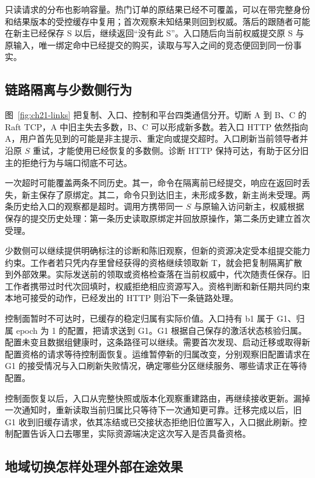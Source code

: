 只读请求的分布也影响容量。热门订单的原结果已经不可覆盖，可以在带完整身份和结果版本的受控缓存中复用；首次观察未知结果则回到权威。落后的跟随者可能在新主已经保存 S 以后，继续返回“没有此 S”。入口随后向当前权威提交原 S 与原输入，唯一绑定命中已经提交的购买，读取与写入之间的竞态便回到同一份事实。

\subsection{链路隔离与少数侧行为}

图~\ref{fig:ch21-links} 把复制、入口、控制和平台四类通信分开。切断 A 到 B、C 的 Raft TCP，A 中旧主失去多数，B、C 可以形成新多数。若入口 HTTP 依然指向 A，用户首先见到的可能是非主提示、重定向或提交超时。入口刷新当前领导者并沿原 $S$ 重试，才能使用已经恢复的多数侧。诊断 HTTP 保持可达，有助于区分旧主的拒绝行为与端口彻底不可达。


一次超时可能覆盖两条不同历史。其一，命令在隔离前已经提交，响应在返回时丢失，新主保存了原绑定。其二，命令只到达旧主，未形成多数，新主尚未受理。两条历史给入口的观察都是超时。调用方携带同一 $S$ 与原输入访问新主，权威根据保存的提交历史处理：第一条历史读取原绑定并回放原操作，第二条历史建立首次受理。

少数侧可以继续提供明确标注的诊断和陈旧观察，但新的资源决定受本组提交能力约束。工作者若只凭内存里曾经获得的资格继续领取新 T，就会把复制隔离扩散到外部效果。实际发送前的领取或资格检查落在当前权威中，代次随责任保存。旧工作者携带过时代次回填时，权威拒绝相应资源写入。资格判断和新任期共同约束本地可接受的动作，已经发出的 HTTP 则沿下一条链路处理。

控制面暂时不可达时，已缓存的稳定归属有实际价值。入口持有 b1 属于 G1、归属 epoch 为 1 的配置，把请求送到 G1。G1 根据自己保存的激活状态核验归属。配置未变且数据组健康时，这条路径可以继续。需要首次发现、启动迁移或取得新配置资格的请求等待控制面恢复。运维暂停新的归属改变，分别观察旧配置请求在 G1 的接受情况与入口刷新失败情况，确定哪些分区继续服务、哪些请求正在等待配置。

控制面恢复以后，入口从完整快照或版本化观察重建路由，再继续接收更新。漏掉一次通知时，重新读取当前归属比只等待下一次通知更可靠。迁移完成以后，旧 G1 收到旧缓存请求，依其冻结或已交接状态拒绝旧位置写入，入口据此刷新。控制配置告诉入口去哪里，实际资源端决定这次写入是否具备资格。

\subsection{地域切换怎样处理外部在途效果}

